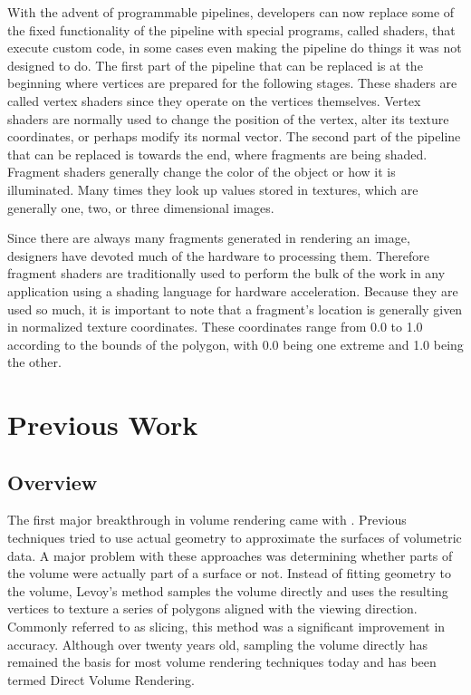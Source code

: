 \documentclass{article}
\begin{document}
With the advent of programmable pipelines, developers can now replace some of
the fixed functionality of the pipeline with special programs, called shaders,
that execute custom code, in some cases even making the pipeline do things it
was not designed to do.  The first part of the pipeline that can be replaced is
at the beginning where vertices are prepared for the following stages.  These
shaders are called vertex shaders since they operate on the vertices themselves.
Vertex shaders are normally used to change the position of the vertex, alter its
texture coordinates, or perhaps modify its normal vector.  The second part of
the pipeline that can be replaced is towards the end, where fragments are being
shaded.  Fragment shaders generally change the color of the object or how it is
illuminated.  Many times they look up values stored in textures, which are
generally one, two, or three dimensional images.

Since there are always many fragments generated in rendering an image, designers
have devoted much of the hardware to processing them.  Therefore fragment
shaders are traditionally used to perform the bulk of the work in any
application using a shading language for hardware acceleration.  Because they
are used so much, it is important to note that a fragment’s location is
generally given in normalized texture coordinates.  These coordinates range from
0.0 to 1.0 according to the bounds of the polygon, with 0.0 being one extreme
and 1.0 being the other.

\section{Previous Work}

\subsection{Overview}

The first major breakthrough in volume rendering came with \cite{Levoy88}.
Previous techniques tried to use actual geometry to approximate the surfaces of
volumetric data.  A major problem with these approaches was determining whether
parts of the volume were actually part of a surface or not.  Instead of fitting
geometry to the volume, Levoy’s method samples the volume directly and uses the
resulting vertices to texture a series of polygons aligned with the viewing
direction.  Commonly referred to as slicing, this method was a significant
improvement in accuracy.  Although over twenty years old, sampling the volume
directly has remained the basis for most volume rendering techniques today and
has been termed Direct Volume Rendering.
\end{document}
